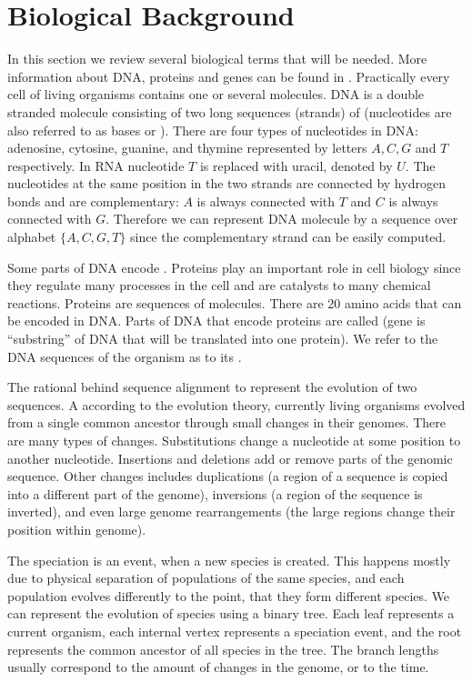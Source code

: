 \section{Biological Background}\label{SECTION:BIOINTRO}

In this section we review several biological terms that will be needed. More
information about DNA, proteins and genes can be found in
\cite{BiologyForDummies, UnderstandingBioinformatics}. Practically every cell of living
organisms contains one or several  molecules. DNA is a double
stranded molecule consisting of two long sequences (strands) of
 (nucleotides are also referred to as bases or
). There are four types of nucleotides in DNA: adenosine,
cytosine, guanine, and thymine represented by letters $A,C,G$ and $T$
respectively. In RNA nucleotide $T$ is replaced with uracil, denoted by $U$.
The nucleotides at the same position in
the two strands are connected by hydrogen bonds and are complementary: $A$ is
always connected with $T$ and $C$ is always connected with $G$. Therefore we
can represent DNA molecule by a sequence over alphabet $\{A,C,G,T\}$ since the
complementary strand can be easily computed.

Some parts of DNA encode . Proteins play an important role in cell
biology since  they regulate many processes in the cell and are catalysts to
many chemical reactions. Proteins are sequences of 
molecules. There are $20$ amino acids that can be encoded in DNA. Parts of DNA
that encode proteins are called  (gene is ``substring'' of
DNA that will be translated into one protein). We refer to the DNA
sequences of the organism as to its .

The rational behind sequence alignment to represent the evolution of two
sequences. A according to the evolution theory, currently living organisms
evolved from a single common ancestor through small changes in their genomes.
There are many types of changes.  Substitutions change  a nucleotide at some
position to another nucleotide.  Insertions and deletions add or remove parts
of the genomic sequence. Other changes includes duplications (a region of a
sequence is copied into a different part of the genome), inversions (a region
of the sequence is inverted), and even large genome rearrangements (the large
regions  change their position within genome). 

The speciation is an event, when a new species is created. This happens mostly
due to physical separation of populations of the same species, and each
population evolves differently to the point, that  they form
different species. We can represent the evolution of species using a binary
tree. Each leaf represents a current organism, each internal vertex represents
a speciation event, and the root represents the common ancestor of all species in
the tree. The branch lengths usually correspond to the amount of changes in
the genome, or to the time. 

